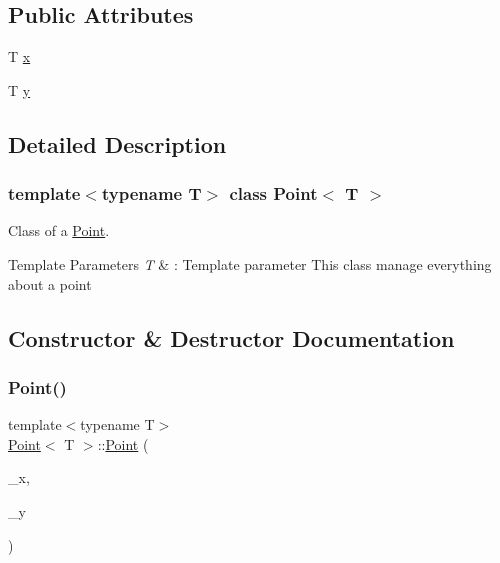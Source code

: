 \subsection*{Public Attributes}
\begin{DoxyCompactItemize}
\item 
T \hyperlink{classPoint_a401d07562afaf0079121218025e66b76}{x}
\item 
T \hyperlink{classPoint_a65146418a33ebb2cd9acb85cade60ac9}{y}
\end{DoxyCompactItemize}


\subsection{Detailed Description}
\subsubsection*{template$<$typename T$>$\newline
class Point$<$ T $>$}

Class of a \hyperlink{classPoint}{Point}. 


\begin{DoxyTemplParams}{Template Parameters}
{\em T} & \+: Template parameter This class manage everything about a point \\
\hline
\end{DoxyTemplParams}


\subsection{Constructor \& Destructor Documentation}
\mbox{\label{classPoint_a0a84c3f55d42ec6e142de0251ea255ad}} 
\subsubsection{\texorpdfstring{Point()}{Point()}}
{\footnotesize\ttfamily template$<$typename T$>$ \\
\hyperlink{classPoint}{Point}$<$ T $>$\+::\hyperlink{classPoint}{Point} (\begin{DoxyParamCaption}\item[{const T \&}]{\+\_\+x,  }\item[{const T \&}]{\+\_\+y }\end{DoxyParamCaption})\hspace{0.3cm}{\ttfamily [inline]}}



